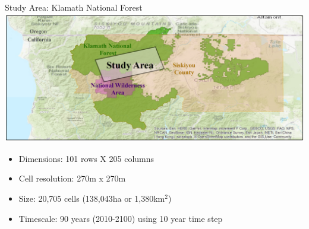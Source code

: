 \documentclass[xcolor=dvipsnames]{beamer}
\begin{document}
\begin{frame}{Study Area: Klamath National Forest}
\centering\includegraphics[width=.9\linewidth]{studyAreaThreeMap.png}

\vspace*{.1in}

\centering\begin{itemize}
\item[] Dimensions: 101 rows X 205 columns 
\item[] Cell resolution: 270m x 270m 
\item[] Size: 20,705 cells (138,043ha or 1,380km$^2$)
\item[] Timescale: 90 years (2010-2100) using 10 year time step
\end{itemize}
\end{frame}
\end{document}
